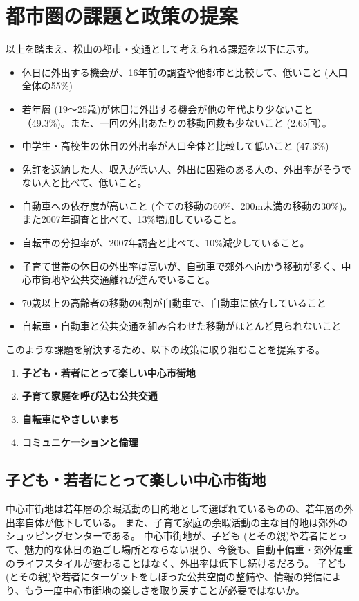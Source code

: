 \documentclass[a4paper,12pt, uplatex]{jsbook}
\begin{document}
\chapter{都市圏の課題と政策の提案}
以上を踏まえ、松山の都市・交通として考えられる課題を以下に示す。
\begin{itemize}
  \item 休日に外出する機会が、16年前の調査や他都市と比較して、低いこと (人口全体の55\%)
  \item 若年層 (19〜25歳)が休日に外出する機会が他の年代より少ないこと（49.3\%)。また、一回の外出あたりの移動回数も少ないこと (2.65回）。
  \item 中学生・高校生の休日の外出率が人口全体と比較して低いこと (47.3\%)
  \item 免許を返納した人、収入が低い人、外出に困難のある人の、外出率がそうでない人と比べて、低いこと。
  \item 自動車への依存度が高いこと (全ての移動の60\%、200m未満の移動の30\%)。また2007年調査と比べて、13\%増加していること。
  \item 自転車の分担率が、2007年調査と比べて、10\%減少していること。
  \item 子育て世帯の休日の外出率は高いが、自動車で郊外へ向かう移動が多く、中心市街地や公共交通離れが進んでいること。
  \item 70歳以上の高齢者の移動の6割が自動車で、自動車に依存していること
  \item 自転車・自動車と公共交通を組み合わせた移動がほとんど見られないこと
\end{itemize}

このような課題を解決するため、以下の政策に取り組むことを提案する。
\begin{enumerate}
  \item \textbf{子ども・若者にとって楽しい中心市街地}
  \item \textbf{子育て家庭を呼び込む公共交通}
  \item \textbf{自転車にやさしいまち}
  \item \textbf{コミュニケーションと倫理}
\end{enumerate}

\section{子ども・若者にとって楽しい中心市街地}
中心市街地は若年層の余暇活動の目的地として選ばれているものの、若年層の外出率自体が低下している。
また、子育て家庭の余暇活動の主な目的地は郊外のショッピングセンターである。
中心市街地が、子ども (とその親)や若者にとって、魅力的な休日の過ごし場所とならない限り、今後も、自動車偏重・郊外偏重のライフスタイルが変わることはなく、外出率は低下し続けるだろう。
子ども (とその親)や若者にターゲットをしぼった公共空間の整備や、情報の発信により、もう一度中心市街地の楽しさを取り戻すことが必要ではないか。
\end{document}
